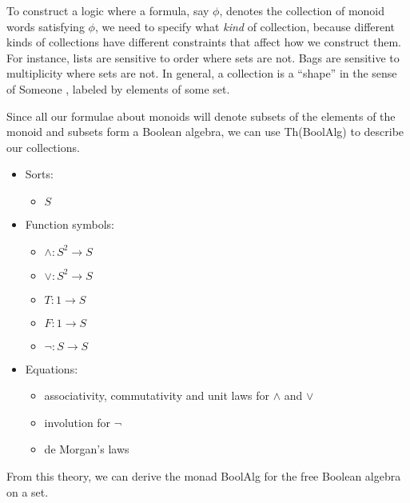 \documentclass{article}
\newcommand{\maps}{\colon}
\begin{document}
To construct a logic where a formula, say $\phi$, denotes the collection of monoid words satisfying $\phi$, we need to specify what \emph{kind} of collection, because different kinds of collections have different constraints that affect how we construct them. For instance, lists are sensitive to order where sets are not. Bags are sensitive to multiplicity where sets are not.  In general, a collection is a ``shape'' in the sense of Someone \cite{someone}, labeled by elements of some set.

Since all our formulae about monoids will denote subsets of the elements of the monoid and subsets form a Boolean algebra, we can use Th(BoolAlg) to describe our collections.
\begin{center}
  \begin{itemize}
    \item Sorts:
    \begin{itemize}
      \item $S$
    \end{itemize}
    \item Function symbols:
    \begin{itemize}
      \item $\land\maps S^2 \to S$
      \item $\lor\maps S^2 \to S$
      \item $T\maps 1 \to S$
      \item $F\maps 1 \to S$
      \item $\neg\maps S \to S$
    \end{itemize}
    \item Equations:
    \begin{itemize}
      \item associativity, commutativity and unit laws for $\land$ and $\lor$
      \item involution for $\neg$
      \item de Morgan's laws
    \end{itemize}
  \end{itemize}
\end{center}
From this theory, we can derive the monad BoolAlg for the free Boolean algebra on a set.
\end{document}
